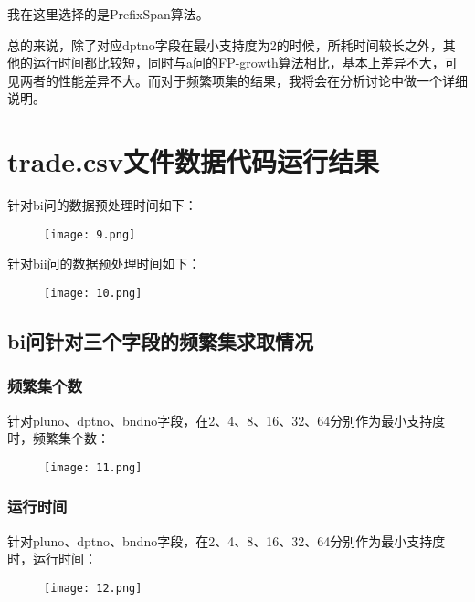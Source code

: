 \documentclass{article}
\begin{document}
\begin{CJK}{UTF8}{gbsn}
我在这里选择的是PrefixSpan算法。

总的来说，除了对应dptno字段在最小支持度为2的时候，所耗时间较长之外，其他的运行时间都比较短，同时与a问的FP-growth算法相比，基本上差异不大，可见两者的性能差异不大。而对于频繁项集的结果，我将会在分析讨论中做一个详细说明。

\section{trade.csv文件数据代码运行结果}

针对bi问的数据预处理时间如下：
\clearpage
\begin{figure}[!h]
\begin{center}
  \texttt{[image: 9.png]}	
\end{center}
\end{figure}

针对bii问的数据预处理时间如下：

\begin{figure}[!h]
\begin{center}
  \texttt{[image: 10.png]}	
\end{center}
\end{figure}


\subsection{bi问针对三个字段的频繁集求取情况}
\subsubsection{频繁集个数}
针对pluno、dptno、bndno字段，在2、4、8、16、32、64分别作为最小支持度时，频繁集个数：

\begin{figure}[!h]
\begin{center}
  \texttt{[image: 11.png]}	
\end{center}
\end{figure}

\clearpage
\subsubsection{运行时间}
针对pluno、dptno、bndno字段，在2、4、8、16、32、64分别作为最小支持度时，运行时间：
\begin{figure}[!h]
\begin{center}
  \texttt{[image: 12.png]}	
\end{center}
\end{figure}


\end{CJK}
\end{document}
